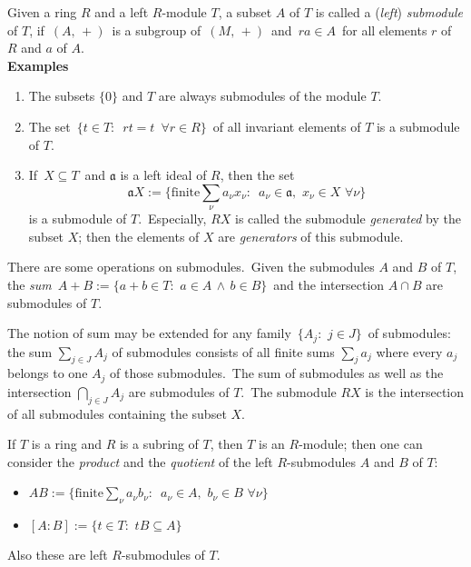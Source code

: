 \documentclass[12pt]{article}
\theoremstyle{definition}
\begin{document}
Given a ring $R$ and a left $R$-module $T$, a subset $A$ of $T$ is called a ({\em left}) {\em submodule} of $T$, if\, $(A,\,+)$\, is a subgroup of\, $(M,\,+)$\, and\, $ra \in A$\, for all elements $r$ of $R$ and $a$ of $A$.\\

\textbf{Examples}
\begin{enumerate}
 \item The subsets $\{0\}$ and $T$ are always submodules of the module $T$.
 \item The set \,$\{t\in T:\,\,\,rt = t\,\,\,\forall r\in R\}$\, of all invariant elements of $T$ is a submodule of $T$.
 \item If \,$X \subseteq T$\, and $\mathfrak{a}$ is a left ideal of $R$, then the set 
$$\mathfrak{a}X := \{\mbox{finite}\sum_\nu a_\nu x_\nu:
 \,\,\,a_\nu\in\mathfrak{a},\,\,x_\nu\in X\,\,\forall\nu\}$$
is a submodule of $T$.\, Especially, $RX$ is called the submodule {\em generated} by the subset $X$; then the elements of $X$ are \emph{generators} of this submodule.
\end{enumerate}

There are some operations on submodules.\, Given the submodules $A$ and $B$ of $T$, the {\em sum}\, $A + B := \{a + b\in T:\,\,a\in A \,\land\, b\in B\}$\, and the intersection $A\cap B$ are submodules of $T$.

The notion of sum may be extended for any family \,$\{A_j:\,\,j\in J\}$\, of submodules:\, the sum $\sum_{j\in J}A_j$ of submodules consists of all finite sums $\sum_j a_j$ where every $a_j$ belongs to one $A_j$ of those submodules.\, The sum of submodules as well as the intersection $\bigcap_{j\in J}A_j$ are submodules of $T$.\, The submodule $RX$ is the intersection of all submodules containing the subset $X$.

If $T$ is a ring and $R$ is a subring of $T$, then $T$ is an $R$-module; then one can consider the {\em product} and the {\em quotient} of the left $R$-submodules $A$ and $B$ of $T$:
\begin{itemize}
\item $AB := \{\mbox{finite}\sum_\nu a_\nu b_\nu:
 \,\,\,a_\nu\in A,\,\,b_\nu\in B\,\,\forall\nu\}$
\item $[A:B] := \{t\in T:\,\, tB\subseteq A\}$
\end{itemize}
Also these are left $R$-submodules of $T$.
\end{document}
